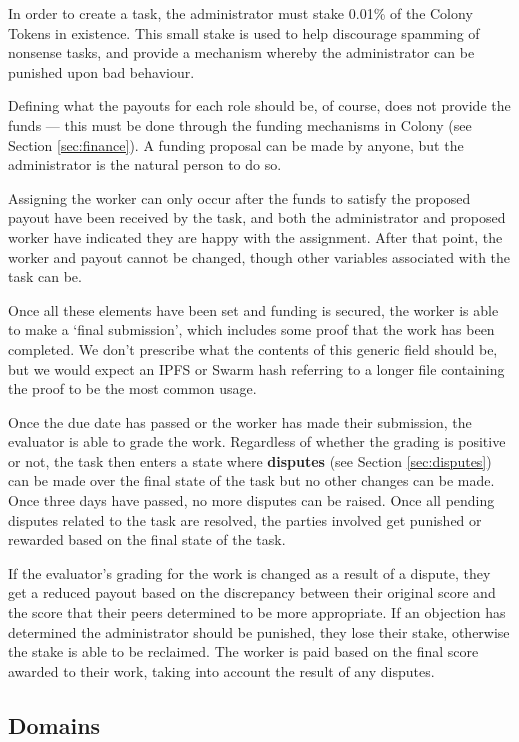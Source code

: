 In order to create a task, the administrator must stake 0.01\% of the Colony Tokens in existence. This small stake is used to help discourage spamming of nonsense tasks, and provide a mechanism whereby the administrator can be punished upon bad behaviour. 

Defining what the payouts for each role should be, of course, does not provide the funds --- this must be done through the funding mechanisms in Colony (see Section \ref{sec:finance}). A funding proposal can be made by anyone, but the administrator is the natural person to do so.

Assigning the worker can only occur after the funds to satisfy the proposed payout have been received by the task, and both the administrator and proposed worker have indicated they are happy with the assignment. After that point, the worker and payout cannot be changed, though other variables associated with the task can be.

Once all these elements have been set and funding is secured, the worker is able to make a `final submission', which includes some proof that the work has been completed. We don't prescribe what the contents of this generic field should be, but we would expect an IPFS or Swarm hash referring to a longer file containing the proof to be the most common usage.

Once the due date has passed or the worker has made their submission, the evaluator is able to grade the work. Regardless of whether the grading is positive or not, the task then enters a state where \textbf{disputes} (see Section \ref{sec:disputes}) can be made over the final state of the task but no other changes can be made. Once three days have passed, no more disputes can be raised. Once all pending disputes related to the task are resolved, the parties involved get punished or rewarded based on the final state of the task.

If the evaluator's grading for the work is changed as a result of a dispute, they get a reduced payout based on the discrepancy between their original score and the score that their peers determined to be more appropriate. If an objection has determined the administrator should be punished, they lose their stake, otherwise the stake is able to be reclaimed. The worker is paid based on the final score awarded to their work, taking into account the result of any disputes.

\subsection{Domains}\label{sec:domains}

